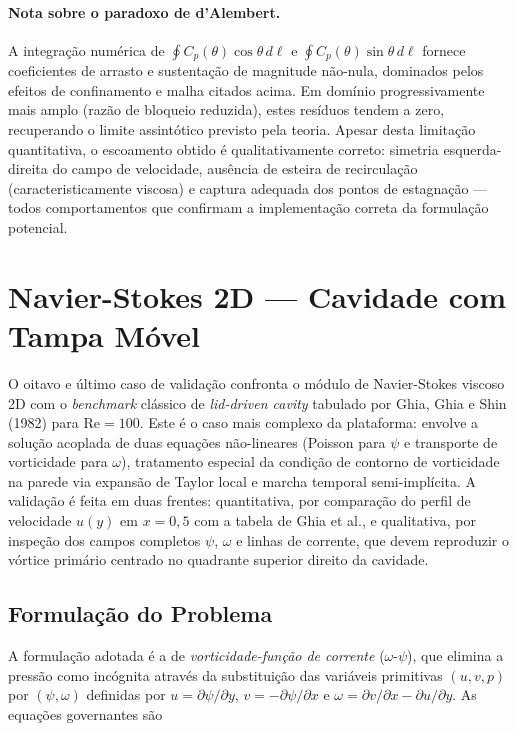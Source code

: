 \paragraph{Nota sobre o paradoxo de d'Alembert.} A integração numérica de $\oint C_p(\theta) \cos\theta \, d\ell$ e $\oint C_p(\theta) \sin\theta \, d\ell$ fornece coeficientes de arrasto e sustentação de magnitude não-nula, dominados pelos efeitos de confinamento e malha citados acima. Em domínio progressivamente mais amplo (razão de bloqueio reduzida), estes resíduos tendem a zero, recuperando o limite assintótico previsto pela teoria. Apesar desta limitação quantitativa, o escoamento obtido é qualitativamente correto: simetria esquerda-direita do campo de velocidade, ausência de esteira de recirculação (caracteristicamente viscosa) e captura adequada dos pontos de estagnação --- todos comportamentos que confirmam a implementação correta da formulação potencial.


\section{Navier-Stokes 2D --- Cavidade com Tampa Móvel}
\label{sec:val_ns}

O oitavo e último caso de validação confronta o módulo de Navier-Stokes viscoso 2D com o \emph{benchmark} clássico de \emph{lid-driven cavity} tabulado por Ghia, Ghia e Shin (1982) para $\mathrm{Re} = 100$. Este é o caso mais complexo da plataforma: envolve a solução acoplada de duas equações não-lineares (Poisson para $\psi$ e transporte de vorticidade para $\omega$), tratamento especial da condição de contorno de vorticidade na parede via expansão de Taylor local e marcha temporal semi-implícita. A validação é feita em duas frentes: quantitativa, por comparação do perfil de velocidade $u(y)$ em $x = 0{,}5$ com a tabela de Ghia et al., e qualitativa, por inspeção dos campos completos $\psi$, $\omega$ e linhas de corrente, que devem reproduzir o vórtice primário centrado no quadrante superior direito da cavidade.

\subsection{Formulação do Problema}

A formulação adotada é a de \emph{vorticidade-função de corrente} ($\omega$-$\psi$), que elimina a pressão como incógnita através da substituição das variáveis primitivas $(u, v, p)$ por $(\psi, \omega)$ definidas por $u = \partial\psi/\partial y$, $v = -\partial\psi/\partial x$ e $\omega = \partial v/\partial x - \partial u/\partial y$. As equações governantes são

